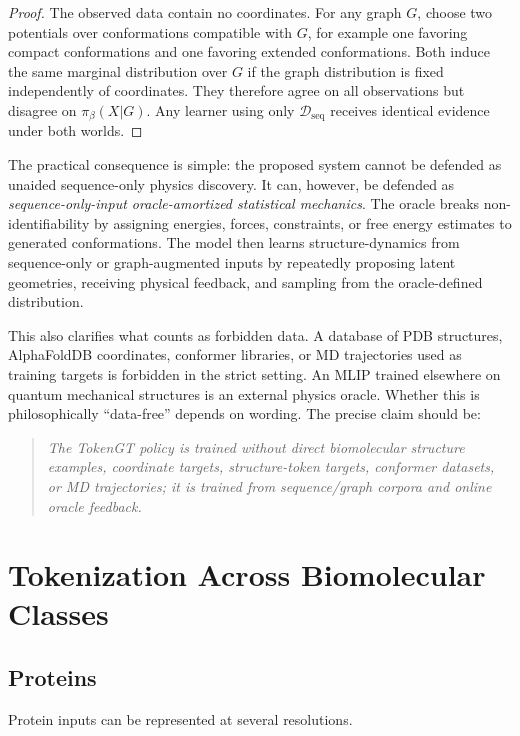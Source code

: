 \documentclass[11pt]{article}
\newcommand{\D}{\mathcal{D}}
\begin{document}
\begin{proof}
The observed data contain no coordinates. For any graph $G$, choose two potentials over conformations compatible with $G$, for example one favoring compact conformations and one favoring extended conformations. Both induce the same marginal distribution over $G$ if the graph distribution is fixed independently of coordinates. They therefore agree on all observations but disagree on $\pi_\beta(X|G)$. Any learner using only $\D_{\mathrm{seq}}$ receives identical evidence under both worlds.
\end{proof}

The practical consequence is simple: the proposed system cannot be defended as unaided sequence-only physics discovery. It can, however, be defended as \emph{sequence-only-input oracle-amortized statistical mechanics}. The oracle breaks non-identifiability by assigning energies, forces, constraints, or free energy estimates to generated conformations. The model then learns structure-dynamics from sequence-only or graph-augmented inputs by repeatedly proposing latent geometries, receiving physical feedback, and sampling from the oracle-defined distribution.

This also clarifies what counts as forbidden data. A database of PDB structures, AlphaFoldDB coordinates, conformer libraries, or MD trajectories used as training targets is forbidden in the strict setting. An MLIP trained elsewhere on quantum mechanical structures is an external physics oracle. Whether this is philosophically ``data-free'' depends on wording. The precise claim should be:
\begin{quote}
\emph{The TokenGT policy is trained without direct biomolecular structure examples, coordinate targets, structure-token targets, conformer datasets, or MD trajectories; it is trained from sequence/graph corpora and online oracle feedback.}
\end{quote}

\section{Tokenization Across Biomolecular Classes}

\subsection{Proteins}

Protein inputs can be represented at several resolutions.
\end{document}
